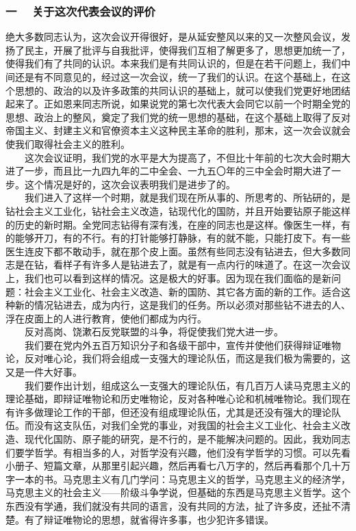 \documentclass[cn,11pt,chinese]{elegantbook}
\def\myformat#1{\hfil\hfil #1}
\begin{document}
\subsubsection*{\myformat{一　 关于这次代表会议的评价}}
绝大多数同志认为，这次会议开得很好，是从延安整风以来的又一次整风会议，发扬了民主，开展了批评与自我批评，使得我们互相了解更多了，思想更加统一了，使得我们有了共同的认识。本来我们是有共同认识的，但是在若干问题上，我们中间还是有不同意见的，经过这一次会议，统一了我们的认识。在这个基础上，在这个思想的、政治的以及许多政策的共同认识的基础上，就可以使我们党更好地团结起来了。正如恩来同志所说，如果说党的第七次代表大会同它以前一个时期全党的思想、政治上的整风，奠定了我们党的统一思想的基础，在这个基础上取得了反对帝国主义、封建主义和官僚资本主义这种民主革命的胜利，那末，这一次会议就会使我们取得社会主义的胜利。\\
　　这次会议证明，我们党的水平是大为提高了，不但比十年前的七次大会时期大进了一步，而且比一九四九年的二中全会、一九五〇年的三中全会时期大进了一步。这个情况是好的，这次会议表明我们是进步了的。\\
　　我们进入了这样一个时期，就是我们现在所从事的、所思考的、所钻研的，是钻社会主义工业化，钻社会主义改造，钻现代化的国防，并且开始要钻原子能这样的历史的新时期。全党同志钻得有深有浅，在座的同志也是这样。像医生一样，有的能够开刀，有的不行。有的打针能够打静脉，有的就不能，只能打皮下。有一些医生连皮下都不敢动手，就在那个皮上面。虽然有些同志没有钻进去，但大多数同志是在钻，看样子有许多人是钻进去了，就是有一点内行的味道了。在这一次会议上，我们也可以看到这样的情况。这是极大的好事。因为现在我们面临的是新问题：社会主义工业化、社会主义改造、新的国防、其它各方面的新的工作。适合这种新的情况钻进去，成为内行，这是我们的任务。所以必须对那些钻不进去的人、浮在皮面上的人进行教育，使他们都成为内行。\\
　　反对高岗、饶漱石反党联盟的斗争，将促使我们党大进一步。\\
　　我们要在党内外五百万知识分子和各级干部中，宣传并使他们获得辩证唯物论，反对唯心论，我们将会组成一支强大的理论队伍，而这是我们极为需要的，这又是一件大好事。\\
　　我们要作出计划，组成这么一支强大的理论队伍，有几百万人读马克思主义的理论基础，即辩证唯物论和历史唯物论，反对各种唯心论和机械唯物论。我们现在有许多做理论工作的干部，但还没有组成理论队伍，尤其是还没有强大的理论队伍。而没有这支队伍，对我们全党的事业，对我国的社会主义工业化、社会主义改造、现代化国防、原子能的研究，是不行的，是不能解决问题的。因此，我劝同志们要学哲学。有相当多的人，对哲学没有兴趣，他们没有学哲学的习惯。可以先看小册子、短篇文章，从那里引起兴趣，然后再看七八万字的，然后再看那个几十万字一本的书。马克思主义有几门学问：马克思主义的哲学，马克思主义的经济学，马克思主义的社会主义——阶级斗争学说，但基础的东西是马克思主义哲学。这个东西没有学通，我们就没有共同的语言，没有共同的方法，扯了许多皮，还扯不清楚。有了辩证唯物论的思想，就省得许多事，也少犯许多错误。\\
\end{document}
